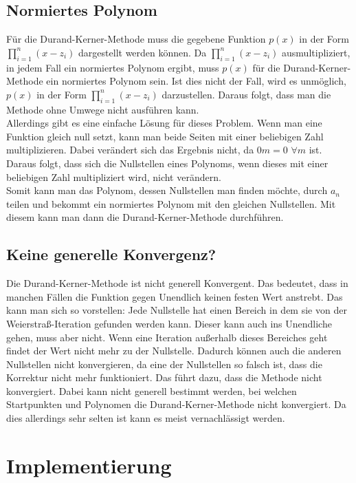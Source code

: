 \documentclass[12pt]{article}
\begin{document}
\subsection{Normiertes Polynom}
Für die Durand-Kerner-Methode muss die gegebene Funktion $p(x)$ in der Form $\prod_{i=1}^n (x-z_i)$ dargestellt werden können. Da $\prod_{i=1}^n (x-z_i)$ ausmultipliziert, in jedem Fall ein normiertes Polynom ergibt, muss $p(x)$ für die Durand-Kerner-Methode ein normiertes Polynom sein.
Ist dies nicht der Fall, wird es unmöglich, $p(x)$ in der Form $\prod_{i=1}^n (x-z_i)$ darzustellen. Daraus folgt, dass man die Methode ohne Umwege nicht ausführen kann. \\
Allerdings gibt es eine einfache Lösung für dieses Problem. Wenn man eine Funktion gleich null setzt, kann man beide Seiten mit einer beliebigen Zahl multiplizieren. Dabei verändert sich das Ergebnis nicht, da $0m = 0$ \space $\forall m$ ist. Daraus folgt, dass sich die Nullstellen eines Polynoms, wenn dieses mit einer beliebigen Zahl multipliziert wird, nicht verändern. \\
Somit kann man das Polynom, dessen Nullstellen man finden möchte, durch $a_n$ teilen und bekommt ein normiertes Polynom mit den gleichen Nullstellen. Mit diesem kann man dann die Durand-Kerner-Methode durchführen.

\subsection{Keine generelle Konvergenz?}
Die Durand-Kerner-Methode ist nicht generell Konvergent. Das bedeutet, dass in manchen Fällen die Funktion gegen Unendlich keinen festen Wert anstrebt. Das kann man sich so vorstellen: Jede Nullstelle hat einen Bereich in dem sie von der Weierstraß-Iteration gefunden werden kann. Dieser kann auch ins Unendliche gehen, muss aber nicht. Wenn eine Iteration außerhalb dieses Bereiches geht findet der Wert nicht mehr zu der Nullstelle. Dadurch können auch die anderen Nullstellen nicht konvergieren, da eine der Nullstellen so falsch ist, dass die Korrektur nicht mehr funktioniert. Das führt dazu, dass die Methode nicht konvergiert. Dabei kann nicht generell bestimmt werden, bei welchen Startpunkten und Polynomen die Durand-Kerner-Methode nicht konvergiert. Da dies allerdings sehr selten ist kann es meist vernachlässigt werden.

\section{Implementierung}
\end{document}
